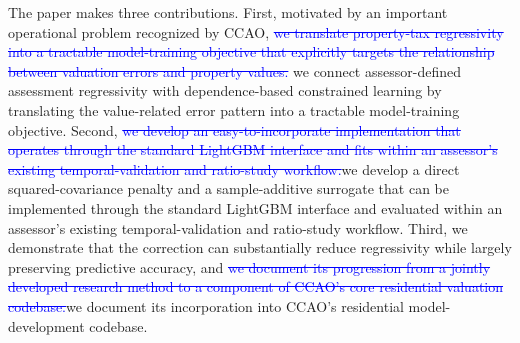 \documentclass[10pt]{article}
\theoremstyle{definition}
\newcommand{\1}{\mathbf{1}}
\begin{document}
{
\color{blue}
The  paper makes three contributions. First, motivated by an important operational problem recognized by CCAO, \textcolor{blue}{\st{we translate property-tax regressivity into a tractable model-training objective that explicitly targets the relationship between valuation errors and property values.}}}
\textcolor{impGreen}{we connect assessor-defined assessment regressivity with dependence-based constrained learning by translating the value-related error pattern into a tractable model-training objective.} Second, \textcolor{blue}{\st{we develop an easy-to-incorporate implementation that operates through the standard LightGBM interface and fits within an assessor's existing temporal-validation and ratio-study workflow.}}\textcolor{impGreen}{we develop a direct squared-covariance penalty and a sample-additive surrogate that can be implemented through the standard LightGBM interface and evaluated within an assessor's existing temporal-validation and ratio-study workflow.} Third, we demonstrate that the correction can substantially reduce regressivity while largely preserving predictive accuracy, and \textcolor{blue}{\st{we document its progression from a jointly developed research method to a component of CCAO's core residential valuation codebase.}}\textcolor{impGreen}{we document its incorporation into CCAO's residential model-development codebase.}

\end{document}

